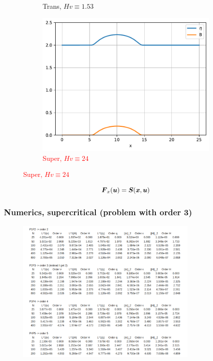 \documentclass[pt12]{beamer}
\newcommand{\uvec}[2][3]{\boldsymbol{#2\mkern-#1mu}\mkern#1mu}
\begin{document}
\begin{frame}
\begin{figure}
\begin{subfigure}[b]{0.30\textwidth}
         \caption{Trans, $Hv\equiv 1.53$}
         \label{convergence_comp_jumps_trans}
     \end{subfigure}
     \begin{subfigure}[b]{0.30\textwidth}
         \centering
         \includegraphics[width=\textwidth]{figures/smooth_steady/sup/sup.pdf}
         \caption{\textcolor{red}{Super, $Hv\equiv 24$}}
         \label{convergence_comp_jumps_super}
     \end{subfigure}
\end{figure}


$$\uvec{F}_x(\uvec{u})=\uvec{S}(\uvec{x},\uvec{u})$$



\end{frame}

\begin{frame}
\frametitle{Numerics, supercritical (problem with order 3)}

\begin{figure}
     \centering
         \includegraphics[width=0.8\textwidth]{figures/smooth_steady/sup/conv.png}
\end{figure}

\end{frame}
\end{document}
